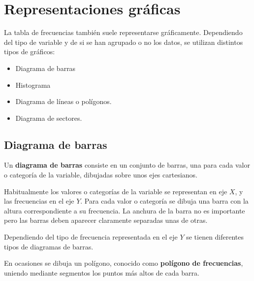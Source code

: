 \documentclass[
  a4paper,
]{scrreport}
\theoremstyle{plain}
\theoremstyle{definition}
\theoremstyle{definition}
\theoremstyle{remark}
\begin{document}
\section{Representaciones gráficas}\label{representaciones-gruxe1ficas}

La tabla de frecuencias también suele representarse gráficamente.
Dependiendo del tipo de variable y de si se han agrupado o no los datos,
se utilizan distintos tipos de gráficos:

\begin{itemize}
\item
  Diagrama de barras
\item
  Histograma
\item
  Diagrama de líneas o polígonos.
\item
  Diagrama de sectores.
\end{itemize}

\subsection{Diagrama de barras}\label{diagrama-de-barras}

Un \textbf{diagrama de barras} consiste en un conjunto de barras, una
para cada valor o categoría de la variable, dibujadas sobre unos ejes
cartesianos.

Habitualmente los valores o categorías de la variable se representan en
eje \(X\), y las frecuencias en el eje \(Y\). Para cada valor o
categoría se dibuja una barra con la altura correspondiente a su
frecuencia. La anchura de la barra no es importante pero las barras
deben aparecer claramente separadas unas de otras.

Dependiendo del tipo de frecuencia representada en el eje \(Y\) se
tienen diferentes tipos de diagramas de barras.

En ocasiones se dibuja un polígono, conocido como \textbf{polígono de
frecuencias}, uniendo mediante segmentos los puntos más altos de cada
barra.
\end{document}
